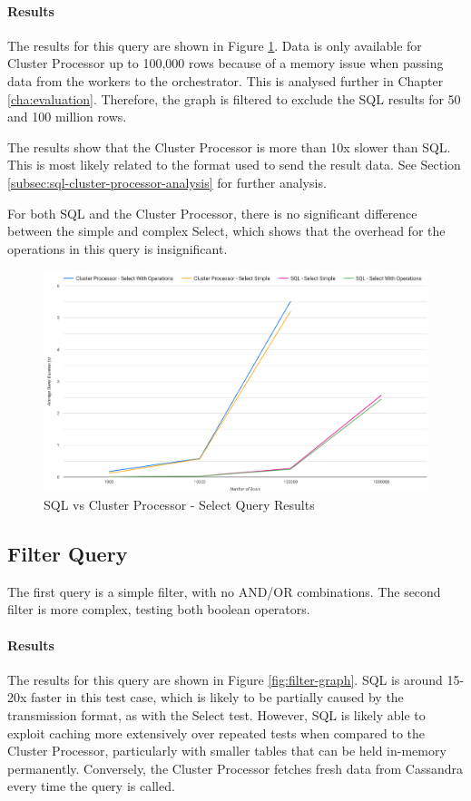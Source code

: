 \paragraph{Results} The results for this query are shown in Figure \ref{fig:select-graph}. Data is only available for Cluster Processor up to 100,000 rows because of a memory issue when passing data from the workers to the orchestrator. This is analysed further in Chapter \ref{cha:evaluation}. Therefore, the graph is filtered to exclude the SQL results for 50 and 100 million rows.

The results show that the Cluster Processor is more than 10x slower than SQL. This is most likely related to the format used to send the result data. See Section \ref{subsec:sql-cluster-processor-analysis} for further analysis. 

For both SQL and the Cluster Processor, there is no significant difference between the simple and complex Select, which shows that the overhead for the operations in this query is insignificant.

\begin{figure}[htp]
	\centering
	\includegraphics[width=0.8\linewidth]{chapters/diagrams/testing/select-simple-1k-1m}
	\caption{SQL vs Cluster Processor - Select Query Results}
	\label{fig:select-graph}
\end{figure}

\subsection{Filter Query}
The first query is a simple filter, with no AND/OR combinations. 
The second filter is more complex, testing both boolean operators. 

\paragraph{Results}
The results for this query are shown in Figure \ref{fig:filter-graph}. SQL is around 15-20x faster in this test case, which is likely to be partially caused by the transmission format, as with the Select test. However, SQL is likely able to exploit caching more extensively over repeated tests when compared to the Cluster Processor, particularly with smaller tables that can be held in-memory permanently. Conversely, the Cluster Processor fetches fresh data from Cassandra every time the query is called.

